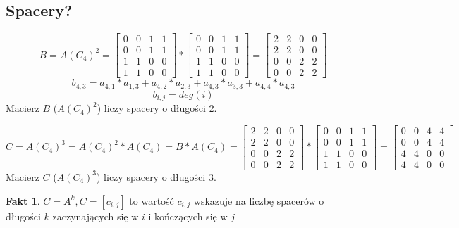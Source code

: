 \documentclass[a4paper,12pt]{article}
\theoremstyle{definition}%
\newtheorem*{fact*}{Fakt} %
\theoremstyle{definition}
\theoremstyle{problem}
\begin{document}
\subsection{Spacery?}
$$B=A(C_4)^2=\begin{bmatrix}
0 & 0 & 1 & 1\\ 
0 & 0 & 1 & 1\\ 
1 & 1 & 0 & 0\\ 
1 & 1 & 0 & 0
\end{bmatrix}*\begin{bmatrix}
0 & 0 & 1 & 1\\ 
0 & 0 & 1 & 1\\ 
1 & 1 & 0 & 0\\ 
1 & 1 & 0 & 0
\end{bmatrix} = \begin{bmatrix}
2 & 2 & 0 & 0\\ 
2 & 2 & 0 & 0\\ 
0 & 0 & 2 & 2\\ 
0 & 0 & 2 & 2
\end{bmatrix}$$
$$b_{4,3}=a_{4,1}*a_{1,3}+a_{4,2}*a_{2,3}+a_{4,3}*a_{3,3}+a_{4,4}*a_{4,3}$$
$$b_{i,j}=deg(i)$$
Macierz $B$ ($A(C_4)^2$) liczy spacery o długości $2$.



$$C=A(C_4)^3=A(C_4)^2*A(C_4)=B*A(C_4)=
\begin{bmatrix}
2 & 2 & 0 & 0\\ 
2 & 2 & 0 & 0\\ 
0 & 0 & 2 & 2\\ 
0 & 0 & 2 & 2
\end{bmatrix}*
\begin{bmatrix}
0 & 0 & 1 & 1\\ 
0 & 0 & 1 & 1\\ 
1 & 1 & 0 & 0\\ 
1 & 1 & 0 & 0
\end{bmatrix} = \begin{bmatrix}
0 & 0 & 4 & 4\\ 
0 & 0 & 4 & 4\\ 
4 & 4 & 0 & 0\\ 
4 & 4 & 0 & 0
\end{bmatrix}$$
Macierz $C$ ($A(C_4)^3$) liczy spacery o długości $3$.

\begin{fact*}
$C=A^k, C=[c_{i,j}]$ to wartość $c_{i,j}$ wskazuje na liczbę spacerów o długości $k$ zaczynających się w $i$ i kończących się w $j$
\end{fact*}
\end{document}
